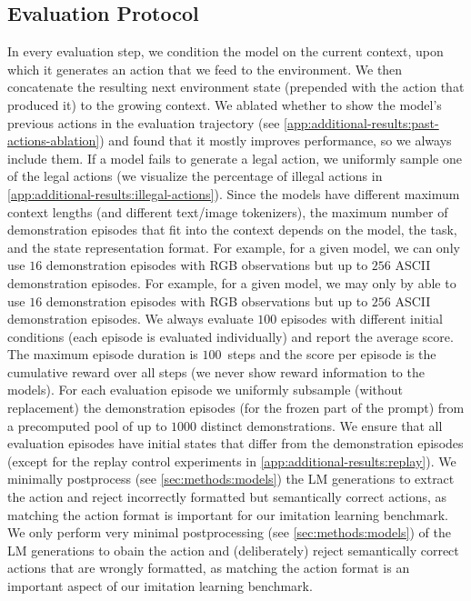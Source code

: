 \documentclass{article}
\begin{document}
\subsection{Evaluation Protocol}
\label{sec:methods:evaluation-protocol}
In every evaluation step, we condition the model on the current context, upon which it generates an action that we feed to the environment.
We then concatenate the resulting next environment state (prepended with the action that produced it) to the growing context.
We ablated whether to show the model's previous actions in the evaluation trajectory (see \cref{app:additional-results:past-actions-ablation}) and found that it mostly improves performance, so we always include them.
If a model fails to generate a legal action, we uniformly sample one of the legal actions (we visualize the percentage of illegal actions in \cref{app:additional-results:illegal-actions}).
Since the models have different maximum context lengths (and different text/image tokenizers), the maximum number of demonstration episodes that fit into the context depends on the model, the task, and the state representation format.
\ificlr
For example, for a given model, we can only use $16$ demonstration episodes with RGB observations but up to $256$ ASCII demonstration episodes.
\else
For example, for a given model, we may only by able to use $16$ demonstration episodes with RGB observations but up to $256$ ASCII demonstration episodes.
\fi
We always evaluate $100$ episodes with different initial conditions (each episode is evaluated individually) and report the average score.
The maximum episode duration is $100$~steps and the score per episode is the cumulative reward over all steps (we never show reward information to the models).
For each evaluation episode we uniformly subsample (without replacement) the demonstration episodes (for the frozen part of the prompt) from a precomputed pool of up to $1000$ distinct demonstrations.
We ensure that all evaluation episodes have initial states that differ from the demonstration episodes (except for the replay control experiments in \cref{app:additional-results:replay}).
\ificlr
We minimally postprocess (see \cref{sec:methods:models}) the LM generations to extract the action and reject incorrectly formatted but semantically correct actions, as matching the action format is important for our imitation learning benchmark.
\else
We only perform very minimal postprocessing (see \cref{sec:methods:models}) of the LM generations to obain the action and (deliberately) reject semantically correct actions that are wrongly formatted, as matching the action format is an important aspect of our imitation learning benchmark.
\fi
\end{document}
